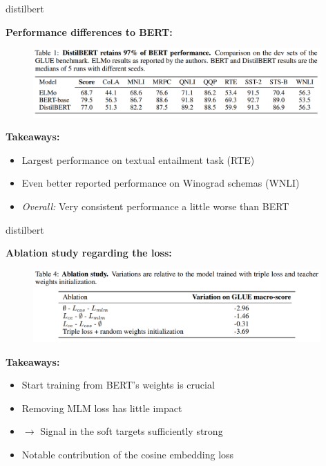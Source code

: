 \begin{frame}{distilbert}

\vfill

	\textbf{Performance differences to BERT:}

	\begin{figure}
		\centering
		\includegraphics[width = 11cm]{figure/53-distilbert-vs-sota.png}\\ 
	\end{figure}


\textbf{Takeaways:}

\begin{itemize}
	\item Largest performance on textual entailment task (RTE)
	\item Even better reported performance on Winograd schemas (WNLI)
	\item \textit{Overall:} Very consistent performance a little worse than BERT
\end{itemize}

\vfill

\end{frame}


\begin{frame}{distilbert}

\vfill

	\textbf{Ablation study regarding the loss:}

	\begin{figure}
		\centering
		\includegraphics[width = 11cm]{figure/53-distilbert-ablation.png}\\ 
	\end{figure}

\textbf{Takeaways:}

\begin{itemize}
	\item Start training from BERT's weights is crucial
	\item Removing MLM loss has little impact\\
	\item[] $\to$ Signal in the soft targets sufficiently strong
	\item Notable contribution of the cosine embedding loss
\end{itemize}

\vfill
	
\end{frame}

